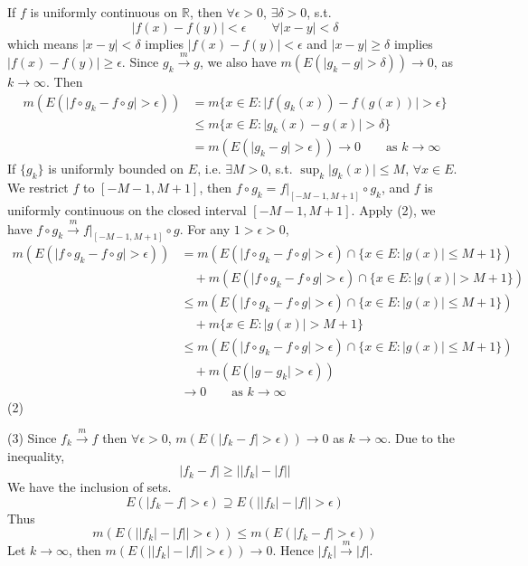 If $f$ is uniformly continuous on $\mathbb{R}$, then $\forall\epsilon>0$, $\exists\delta>0$, s.t.
\[
\lvert f(x)-f(y) \rvert <\epsilon \qquad \forall \lvert x-y \rvert <\delta
\]
which means $\lvert x-y \rvert<\delta$ implies $\lvert f(x)-f(y) \rvert<\epsilon$ and $\lvert x-y \rvert\geq\delta$ implies $\lvert f(x)-f(y) \rvert\geq\epsilon$. Since $g_{k}\overset{ m }{ \to }g$, we also have $m(E(\lvert g_k-g\rvert>\delta))\to0$, as $k\to \infty$. Then
\[
\begin{aligned}
m(E(\lvert f\circ g_k-f\circ g \rvert >\epsilon)) & =m\{ x\in E:\lvert f(g_k(x))-f(g(x)) \rvert >\epsilon \} \\
 & \leq m\{ x\in E:\lvert g_k(x)-g(x) \rvert >\delta  \} \\
 & =m(E(\lvert g_k-g \rvert >\epsilon))\to0\qquad \text{as }k\to \infty 
\end{aligned}
\]
If $\{ g_k \}$ is uniformly bounded on $E$, i.e. $\exists M>0$, s.t. $\sup_{k}\lvert g_k(x) \rvert\leq M$, $\forall x\in E$. We restrict $f$ to $[-M-1,M+1]$, then $f\circ g_k=\left.f\right|_{[-M-1,M+1]}\circ g_k$, and $f$ is uniformly continuous on the closed interval $[-M-1,M+1]$. Apply (2), we have $f\circ g_k\overset{ m }{ \to } \left.f\right|_{[-M-1,M+1]}\circ g$. For any $1>\epsilon>0$,
\[
\begin{aligned}
m(E(\lvert f\circ g_k-f\circ g \rvert >\epsilon)) & =m(E(\lvert f\circ g_k-f\circ g \rvert >\epsilon)\cap \{ x\in E:\lvert g(x)\rvert \leq M+1 \}) \\
 & \quad +m(E(\lvert f\circ g_k-f\circ g \rvert >\epsilon)\cap \{ x\in E:\lvert g(x) \rvert >M+1 \}) \\
 & \leq m(E(\lvert f\circ g_k-f\circ g \rvert >\epsilon)\cap \{ x\in E:\lvert g(x)\rvert \leq M+1 \}) \\
 & \quad +m\{ x\in E:\lvert g(x) \rvert >M+1 \}  \\
 & \leq m(E(\lvert f\circ g_k-f\circ g \rvert >\epsilon)\cap \{ x\in E:\lvert g(x)\rvert \leq M+1 \}) \\
 & \quad +m(E(\lvert g-g_k \rvert >\epsilon))   \\
 & \to0\qquad \text{as }k\to \infty
\end{aligned}
\]
(2)

(3)
Since $f_k\overset{ m }{ \to }f$ then $\forall\epsilon>0$, $m(E(\lvert f_k-f \rvert>\epsilon))\to0$ as $k\to \infty$. Due to the inequality,
\[
\lvert f_k-f \rvert \geq \lvert \lvert f_k \rvert -\lvert f \rvert  \rvert
\]
We have the inclusion of sets.
\[
E(\lvert f_k-f \rvert >\epsilon)\supseteq E(\lvert \lvert f_k \rvert -\lvert f \rvert  \rvert >\epsilon)
\]
Thus
\[
m(E(\lvert \lvert f_k \rvert -\lvert f \rvert  \rvert >\epsilon))\leq m(E(\lvert f_k-f \rvert >\epsilon))
\]
Let $k\to \infty$, then $m(E(\lvert \lvert f_k \rvert-\lvert f \rvert \rvert>\epsilon))\to0$. Hence $\lvert f_k \rvert\overset{ m }{ \to }\lvert f \rvert$.

